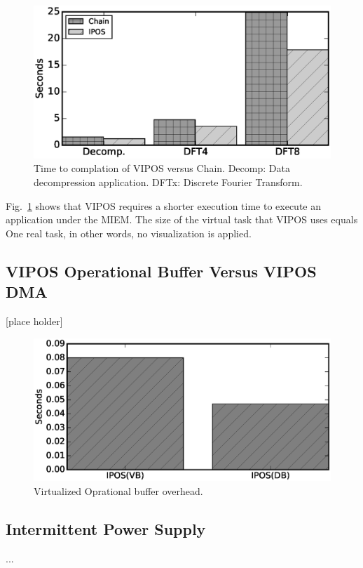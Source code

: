 \documentclass[sigconf,anonymous,review]{acmart}
\begin{document}
\begin{figure}[t]
	\centering
	\includegraphics[width=0.7\columnwidth]{figures/executionTime.eps}
	\caption{Time to complation of VIPOS versus Chain. Decomp: Data decompression application. DFTx: Discrete Fourier Transform.}
	\label{fig:IPOSPerformance}
\end{figure}

Fig.~\ref{fig:IPOSPerformance} shows that VIPOS requires a shorter execution time to execute an application under the MIEM. The size of the virtual task that VIPOS uses equals One real task, in other words, no visualization is applied.

\subsection{VIPOS Operational Buffer Versus VIPOS DMA}[place holder]
			\begin{figure}[t]
				\centering
				\includegraphics[width=0.7\columnwidth]{figures/ipos_virtualizedBuffer_overhead.eps}
				\caption{Virtualized Oprational buffer overhead.}
				\label{fig:virtualBuffer}
			\end{figure}


\subsection{Intermittent Power Supply}
...



\end{document}
